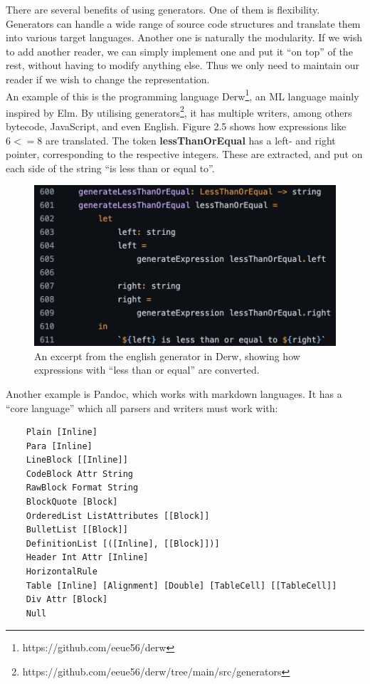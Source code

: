There are several benefits of using generators. One of them is flexibility. Generators can handle a wide range of source code structures and translate them into various target languages. Another one is naturally the modularity. If we wish to add another reader, we can simply implement one and put it ``on top'' of the rest, without having to modify anything else. Thus we only need to maintain our reader if we wish to change the representation. \hfill \\

An example of this is the programming language Derw\footnote{https://github.com/eeue56/derw}, an ML language mainly inspired by Elm. By utilising generators\footnote{https://github.com/eeue56/derw/tree/main/src/generators}, it has multiple writers, among others bytecode, JavaScript, and even English. Figure 2.5 shows how expressions like $6 <= 8$ are translated. The token \textbf{lessThanOrEqual} has a left- and right pointer, corresponding to the respective integers. These are extracted, and put on each side of the string ``is less than or equal to''. \hfill \\

\begin{figure}[ht]
    \centering
    \includegraphics[scale=0.7]{assets/derwLTE.png}
    \caption[]{An excerpt from the english generator in Derw, showing how expressions with ``less than or equal'' are converted\footnotemark.}
    \label{fig:derw}
\end{figure}

Another example is Pandoc, which works with markdown languages. It has a ``core language'' which all parsers and writers must work with:

\begin{verbatim}
    Plain [Inline]
    Para [Inline]
    LineBlock [[Inline]]
    CodeBlock Attr String
    RawBlock Format String
    BlockQuote [Block]
    OrderedList ListAttributes [[Block]]
    BulletList [[Block]]
    DefinitionList [([Inline], [[Block]])]
    Header Int Attr [Inline]
    HorizontalRule
    Table [Inline] [Alignment] [Double] [TableCell] [[TableCell]]
    Div Attr [Block]
    Null
\end{verbatim}

